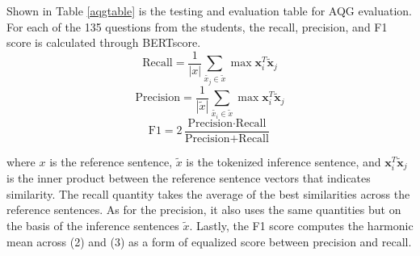 \documentclass[conference]{IEEEtran}
\begin{document}
    \indent Shown in Table \ref{aqgtable} is the testing 
    and evaluation table for AQG evaluation. For each of 
    the 135 questions from the students, the recall, 
    precision, and F1 score is calculated through 
    BERTscore.     
    \vspace{0.75cm}
    \begin{equation}
        \textrm{Recall} = \frac {1} {|x|} 
        \sum _ {\tilde{x_j}\in \tilde{x}}\max \textbf{x}_i^T \tilde{\textbf{x}}_j
    \end{equation}
    \vspace{0.75cm}
    \begin{equation}
        \textrm{Precision} = \frac {1} {|\tilde{x}|} 
        \sum _ {\tilde{x_i}\in \tilde{x}}\max \textbf{x}_i^T \tilde{\textbf{x}}_j
    \end{equation}
    \vspace{0.75cm}
    \begin{equation}
        \textrm{F1} = 2 \frac{\textrm{Precision}\cdot\textrm{Recall}}{
        \textrm{Precision} + \textrm{Recall}
        }
    \end{equation}
    \vspace{0.5cm}

    where $x$ is the reference sentence, $\tilde{x}$ is the tokenized inference sentence, 
    and $\textbf{x}_i^T\tilde{\textbf{x}}_j$ is the 
    inner product between the reference sentence vectors that 
    indicates similarity. The recall quantity
    takes the average of the best similarities across 
    the reference sentences. As for the precision, 
    it also uses the same quantities but on the 
    basis of the inference sentences $\tilde{x}$. Lastly,
    the F1 score computes the harmonic mean across (2) and (3)
    as a form of equalized score between precision and 
    recall.
\newpage
\end{document}
